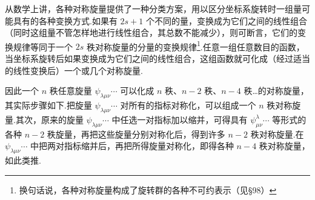 从数学上讲，各种对称旋量提供了一种分类方案，用以区分坐标系旋转时一组量可能具有的各种变换方式.如果有 $2s+1$ 个不同的量，变换成为它们之间的线性组合（同时这组量不管怎样地进行线性组合，其总数不能减少），则可断言，它们的变换规律等同于一个 $2s$ 秩对称旋量的分量的变换规律\footnote{换句话说，各种对称旋量构成了旋转群的各种不可约表示（见§98）}.任意一组任意数目的函数，当坐标系旋转后如果变换成为它们之间的线性组合，这组函数就可化成（经过适当的线性变换后）一个或几个对称旋量.

因此一个 $n$ 秩任意旋量 $\psi_{\lambda\mu\nu}\cdots$ 可以化成 $n$ 秩、$n-2$ 秩、$n-4$ 秩…的对称旋量，其实际步骤如下.把旋量 $\psi_{\lambda\mu\nu}\cdots$ 对所有的指标对称化，可以组成一个 $n$ 秩对称旋量.其次，原来的旋量 $\psi_{\lambda\mu\nu}\cdots$ 中任选一对指标加以缩并，可得具有 $\psi^{\lambda}_{\mu\nu}\cdots$ 等形式的各种 $n-2$ 秩旋量，再把这些旋量分别对称化后，得到许多 $n-2$ 秩对称旋量.在 $\psi_{\lambda\mu\nu}\cdots$ 中把两对指标缩并后，再把所得旋量对称化，即得各种 $n-4$ 秩对称旋量，如此类推.

